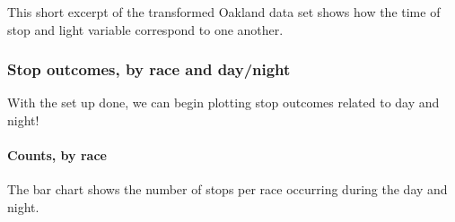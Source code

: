 \documentclass[
]{book}
\newenvironment{Shaded}{\begin{snugshade}}{\end{snugshade}}
\newcommand{\CommentTok}[1]{\textcolor[rgb]{0.56,0.35,0.01}{\textit{#1}}}
\newcommand{\DataTypeTok}[1]{\textcolor[rgb]{0.13,0.29,0.53}{#1}}
\newcommand{\KeywordTok}[1]{\textcolor[rgb]{0.13,0.29,0.53}{\textbf{#1}}}
\newcommand{\NormalTok}[1]{#1}
\newcommand{\OperatorTok}[1]{\textcolor[rgb]{0.81,0.36,0.00}{\textbf{#1}}}
\newcommand{\StringTok}[1]{\textcolor[rgb]{0.31,0.60,0.02}{#1}}
\begin{document}
\begin{Shaded}
\end{Shaded}

This short excerpt of the transformed Oakland data set shows how the time of stop and light variable correspond to one another.

\hypertarget{stop-outcomes-by-race-and-daynight}{%
\subsubsection{Stop outcomes, by race and day/night}\label{stop-outcomes-by-race-and-daynight}}

With the set up done, we can begin plotting stop outcomes related to day and night!

\hypertarget{counts-by-race}{%
\paragraph{Counts, by race}\label{counts-by-race}}

The bar chart shows the number of stops per race occurring during the day and night.
\end{document}
